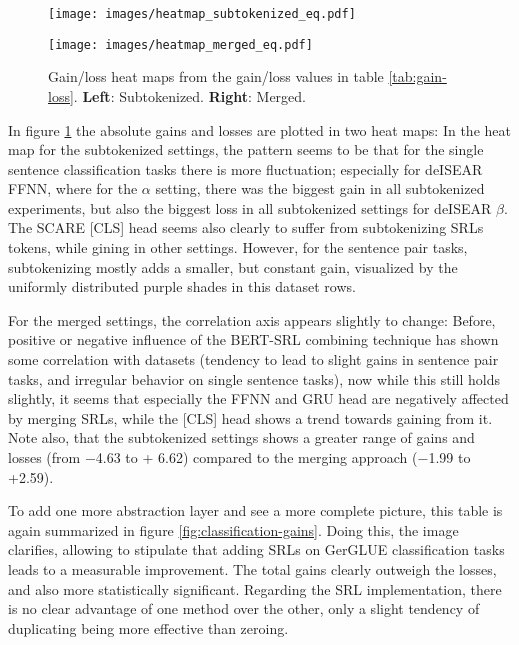 \begin{figure}
  \begin{minipage}{0.45\linewidth}
  \vspace{0pt}
    \texttt{[image: images/heatmap\_subtokenized\_eq.pdf]}
  \end{minipage}
  \hfill
  \begin{minipage}{0.45\linewidth}
  \vspace{0pt}
    \texttt{[image: images/heatmap\_merged\_eq.pdf]}
  \end{minipage}
  \caption[Heatmaps subtokenizd and merged]{Gain/loss heat maps from the gain/loss values in table \ref{tab:gain-loss}. \textbf{Left}: Subtokenized. \textbf{Right}: Merged.}
  \label{fig:heatmap-gains}
\end{figure}

In figure \ref{fig:heatmap-gains} the absolute gains and losses are plotted in two heat maps:
In the heat map for the subtokenized settings, the pattern seems to be that for the single
sentence classification tasks there is more fluctuation; especially for deISEAR FFNN, where
for the $\alpha$ setting, there was the biggest gain in all subtokenized experiments, but
also the biggest loss in all subtokenized settings for deISEAR $\beta$. The SCARE [CLS] head
seems also clearly to suffer from subtokenizing SRLs tokens, while gining in other settings.
However, for the sentence pair tasks, subtokenizing mostly adds a smaller, but constant gain,
visualized by the uniformly distributed purple shades in this dataset rows.

For the merged settings, the correlation axis appears slightly to change: Before, positive or
negative influence of the BERT-SRL combining technique has shown some correlation with datasets
(tendency to lead to slight gains in sentence pair tasks, and irregular behavior on single
sentence tasks), now while this still holds slightly, it seems that especially the FFNN and GRU
head are negatively affected by merging SRLs, while the [CLS] head shows a trend towards
gaining from it. Note also, that the subtokenized settings shows a greater range of gains and
losses (from $-$4.63 to + 6.62) compared to the merging approach ($-$1.99 to +2.59).

To add one more abstraction layer and see a more complete picture, this table is again
summarized in figure \ref{fig:classification-gains}. Doing this, the image
clarifies, allowing to stipulate that adding SRLs on GerGLUE classification tasks
leads to a measurable improvement. The total gains clearly outweigh the losses, and also
more statistically significant. Regarding the SRL implementation, there is no clear advantage
of one method over the other, only a slight tendency of duplicating being more effective
than zeroing.


